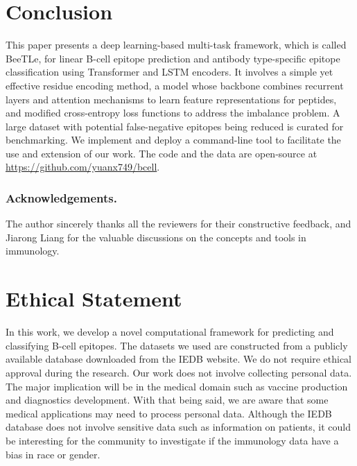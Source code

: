 \documentclass[runningheads]{llncs}
\begin{document}
\section{Conclusion}
This paper presents a deep learning-based multi-task framework, which is called BeeTLe, for linear B-cell epitope prediction and antibody type-specific epitope classification using Transformer and LSTM encoders. It involves a simple yet effective residue encoding method, a model whose backbone combines recurrent layers and attention mechanisms to learn feature representations for peptides, and modified cross-entropy loss functions to address the imbalance problem. A large dataset with potential false-negative epitopes being reduced is curated for benchmarking. We implement and deploy a command-line tool to facilitate the use and extension of our work. The code and the data are open-source at \url{https://github.com/yuanx749/bcell}.

\subsubsection{Acknowledgements.}
The author sincerely thanks all the reviewers for their constructive feedback, and Jiarong Liang for the valuable discussions on the concepts and tools in immunology.

%
%
%


%

\section*{Ethical Statement}
In this work, we develop a novel computational framework for predicting and classifying B-cell epitopes. The datasets we used are constructed from a publicly available database downloaded from the IEDB website. We do not require ethical approval during the research. Our work does not involve collecting personal data. The major implication will be in the medical domain such as vaccine production and diagnostics development. With that being said, we are aware that some medical applications may need to process personal data. Although the IEDB database does not involve sensitive data such as information on patients, it could be interesting for the community to investigate if the immunology data have a bias in race or gender.
\end{document}
